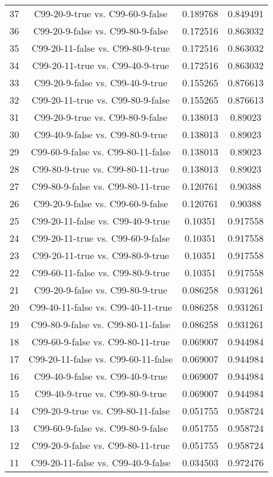 \documentclass[a4paper,10pt]{article}
\begin{document}
\begin{landscape}
\begin{table}[!htp]
\begin{tabular}{cccc}
37&C99-20-9-true vs. C99-60-9-false&0.189768&0.849491\\
36&C99-20-9-false vs. C99-80-9-false&0.172516&0.863032\\
35&C99-20-11-false vs. C99-80-9-true&0.172516&0.863032\\
34&C99-20-11-true vs. C99-40-9-true&0.172516&0.863032\\
33&C99-20-9-false vs. C99-40-9-true&0.155265&0.876613\\
32&C99-20-11-true vs. C99-80-9-false&0.155265&0.876613\\
31&C99-20-9-true vs. C99-80-9-false&0.138013&0.89023\\
30&C99-40-9-false vs. C99-80-9-true&0.138013&0.89023\\
29&C99-60-9-false vs. C99-80-11-false&0.138013&0.89023\\
28&C99-80-9-true vs. C99-80-11-true&0.138013&0.89023\\
27&C99-80-9-false vs. C99-80-11-true&0.120761&0.90388\\
26&C99-20-9-false vs. C99-60-9-false&0.120761&0.90388\\
25&C99-20-11-false vs. C99-40-9-true&0.10351&0.917558\\
24&C99-20-11-true vs. C99-60-9-false&0.10351&0.917558\\
23&C99-20-11-true vs. C99-80-9-true&0.10351&0.917558\\
22&C99-60-11-false vs. C99-80-9-true&0.10351&0.917558\\
21&C99-20-9-false vs. C99-80-9-true&0.086258&0.931261\\
20&C99-40-11-false vs. C99-40-11-true&0.086258&0.931261\\
19&C99-80-9-false vs. C99-80-11-false&0.086258&0.931261\\
18&C99-60-9-false vs. C99-80-11-true&0.069007&0.944984\\
17&C99-20-11-false vs. C99-60-11-false&0.069007&0.944984\\
16&C99-40-9-false vs. C99-40-9-true&0.069007&0.944984\\
15&C99-40-9-true vs. C99-80-9-true&0.069007&0.944984\\
14&C99-20-9-true vs. C99-80-11-false&0.051755&0.958724\\
13&C99-60-9-false vs. C99-80-9-false&0.051755&0.958724\\
12&C99-20-9-false vs. C99-80-11-true&0.051755&0.958724\\
11&C99-20-11-false vs. C99-40-9-false&0.034503&0.972476\\

\end{tabular}
\end{table}
\end{landscape}
\end{document}
